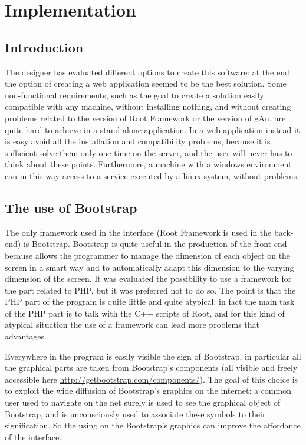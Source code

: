 
\chapter{Implementation} %

\label{Chapter6} %


\section{Introduction}

The designer has evaluated different options to create this software: at the end the option of creating a web application seemed to be the best solution.
Some non-functional requirements, such as the goal to create a solution easily compatible with any machine, without installing nothing, and without creating problems related to the version of Root Framework or the version of gAn, are quite hard to achieve in a stand-alone application. In a web application instead it is easy avoid all the installation and compatibility problems, because it is sufficient solve them only one time on the server, and the user will never has to think about these points. Furthermore, a machine with a windows environment can in this way access to a service executed by a linux system, without problems.  

\section{The use of Bootstrap}

The only framework used in the interface (Root Framework is used in the back-end) is Bootstrap. Bootstrap is quite useful in the production of the front-end because allows the programmer to manage the dimension of each object on the screen in a smart way and to automatically adapt this dimension to the varying dimension of the screen. It was evaluated the possibility to use a framework for the part related to PHP, but it was preferred not to do so. The point is that the PHP part of the program is quite little and quite atypical: in fact the main task of the PHP part is to talk with the C++ scripts of Root, and for this kind of atypical situation the use of a framework can lead more problems that advantages.  

Everywhere in the program is easily visible the sign of Bootstrap, in particular all the graphical parts are taken from Bootstrap's components (all visible and freely accessible here \url{http://getbootstrap.com/components/}). The goal of this choice is to exploit the wide diffusion of Bootstrap's graphics on the internet: a common user used to navigate on the net surely is used to see the graphical object of Bootstrap, and is unconsciously used to associate these symbols to their signification. So the using on the Bootstrap's graphics can improve the affordance of the interface. 


